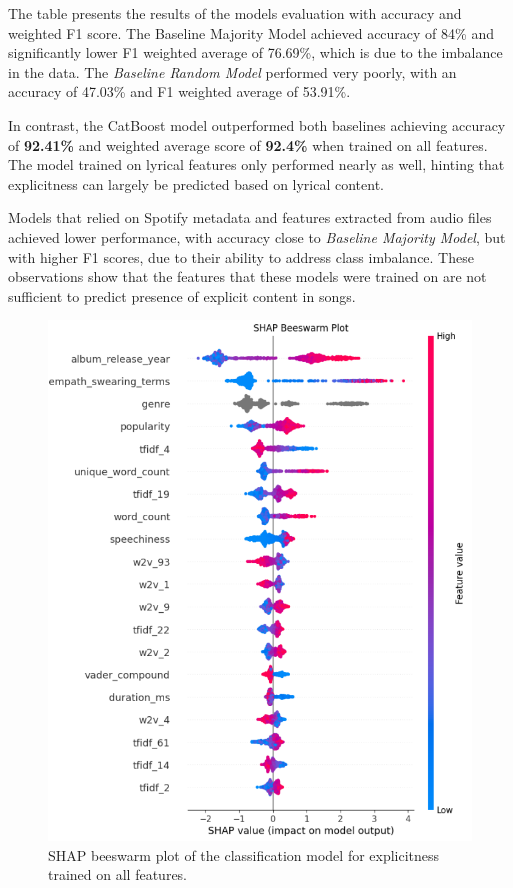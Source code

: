 The table presents the results of the models evaluation with accuracy and
weighted F1 score. The Baseline Majority Model achieved accuracy of 84\% and
significantly lower F1 weighted average of 76.69\%, which is due to the
imbalance in the data. The \textit{Baseline Random Model} performed very
poorly, with an accuracy of 47.03\% and F1 weighted average of 53.91\%.

In contrast, the CatBoost model outperformed both baselines achieving accuracy
of \textbf{92.41\%} and weighted average score of \textbf{92.4\%} when trained
on all features. The model trained on lyrical features only performed nearly as
well, hinting that explicitness can largely be predicted based on lyrical
content. 

Models that relied on Spotify metadata and features extracted from
audio files achieved lower performance, with accuracy close to \textit{Baseline
Majority Model}, but with higher F1 scores, due to their ability to address
class imbalance. These observations show that the features that these models
were trained on are not sufficient to predict presence of explicit content
in songs.


\begin{center}
\begin{figure}[H]
  \centering
  \includegraphics[width=5in]{img/beeswarm_explicitness.png}
  \caption{SHAP beeswarm plot of the classification model for explicitness trained on all features.}
  \label{Figure:fig_beh}
\end{figure}
\end{center}

